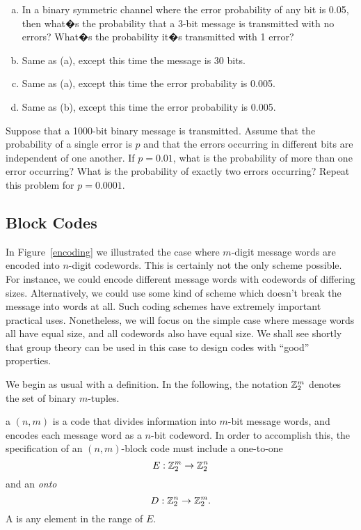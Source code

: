  \begin{exercise}{}
 \begin{enumerate}[(a)]
 \item
 In a binary symmetric channel  where the error probability of any bit is 0.05, then what�s the probability that a 3-bit message  is transmitted with no errors? What�s the probability it�s transmitted with 1 error?
 \item
 Same as (a), except this time the message is 30 bits.
 \item
 Same as (a), except this time the error probability is 0.005.
 \item
 Same as (b), except this time the error probability is 0.005.
 \end{enumerate}
 \end{exercise}
 
 
\begin{exercise}{}
Suppose that a 1000-bit binary message is transmitted. Assume that the
probability of a single error is $p$ and that the errors occurring in
different bits are independent of one another. If $p = 0.01$, what is
the probability of more than one error occurring? What is the
probability of exactly two errors occurring?  Repeat this problem for
$p = 0.0001$.
\end{exercise}
 
\subsection{Block Codes}
 
In Figure~\ref{encoding} we illustrated the case where $m$-digit message words 
are encoded into $n$-digit codewords. This is certainly not the only scheme possible. For instance, we could encode different message words with codewords of differing sizes. Alternatively, we could use some kind of scheme which doesn't break the message into words at all. Such coding schemes have extremely important practical uses. Nonetheless, we will focus on the simple case where message words all have equal size, and all codewords also have equal size. We shall see shortly that group
theory  can be used in this case to design  codes with ``good'' properties. 

We begin as usual with a definition. In the following, the notation ${\Bbb Z}^{m}_{2}$ denotes the set of  binary $m$-tuples.

\begin{defn}\label{definition:algcodes:BlockCode}
a $(n, m)$   is a code that divides information into $m$-bit message words, and encodes each message word as a $n$-bit codeword. In order to accomplish this, the specification of an $(n,
m)$-block code must include a one-to-one  
\[
E:{\Bbb Z}^{m}_{2} \rightarrow {\Bbb Z}^{n}_{2}
\]
and an \emph{onto}  
\[
D:{\Bbb Z}^{n}_{2} \rightarrow {\Bbb Z}^{m}_{2}.
\]
A   is any element in the range of $E$. 
\end{defn}

